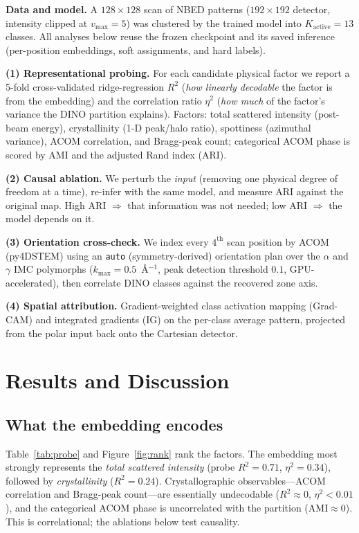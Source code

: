 \documentclass[journal=cmatex,manuscript=article,layout=twocolumn]{achemso}
\begin{document}
\textbf{Data and model.} A $128\times128$ scan of NBED patterns
($192\times192$ detector, intensity clipped at $v_{\max}=5$) was clustered by
the trained model into $K_{\mathrm{active}}=13$ classes. All analyses below
reuse the frozen checkpoint and its saved inference (per-position embeddings,
soft assignments, and hard labels).

\textbf{(1) Representational probing.} For each candidate physical factor we
report a 5-fold cross-validated ridge-regression $R^2$ (\emph{how linearly
decodable} the factor is from the embedding) and the correlation ratio
$\eta^2$ (\emph{how much} of the factor's variance the DINO partition
explains). Factors: total scattered intensity (post-beam energy),
crystallinity (1-D peak/halo ratio), spottiness (azimuthal variance), ACOM
correlation, and Bragg-peak count; categorical ACOM phase is scored by AMI
and the adjusted Rand index (ARI).

\textbf{(2) Causal ablation.} We perturb the \emph{input} (removing one
physical degree of freedom at a time), re-infer with the same model, and
measure ARI against the original map. High ARI $\Rightarrow$ that information
was not needed; low ARI $\Rightarrow$ the model depends on it.

\textbf{(3) Orientation cross-check.} We index every $4^{\mathrm{th}}$ scan
position by ACOM (py4DSTEM\cite{savitzky2021,ophus2022}) using an
\texttt{auto} (symmetry-derived) orientation plan over the $\alpha$ and
$\gamma$ IMC polymorphs ($k_{\max}=0.5$~\AA$^{-1}$, peak detection threshold
$0.1$, GPU-accelerated), then correlate DINO classes against the recovered
zone axis.

\textbf{(4) Spatial attribution.} Gradient-weighted class activation mapping
(Grad-CAM) and integrated gradients (IG) on the per-class average pattern,
projected from the polar input back onto the Cartesian detector.

\section{Results and Discussion}

\subsection{What the embedding encodes}

Table~\ref{tab:probe} and Figure~\ref{fig:rank} rank the factors. The
embedding most strongly represents the \emph{total scattered intensity}
(probe $R^2=0.71$, $\eta^2=0.34$), followed by \emph{crystallinity}
($R^2=0.24$). Crystallographic observables---ACOM correlation and Bragg-peak
count---are essentially undecodable ($R^2\approx0$, $\eta^2<0.01$), and the
categorical ACOM phase is uncorrelated with the partition
($\mathrm{AMI}\approx0$). This is correlational; the ablations below test
causality.
\end{document}
